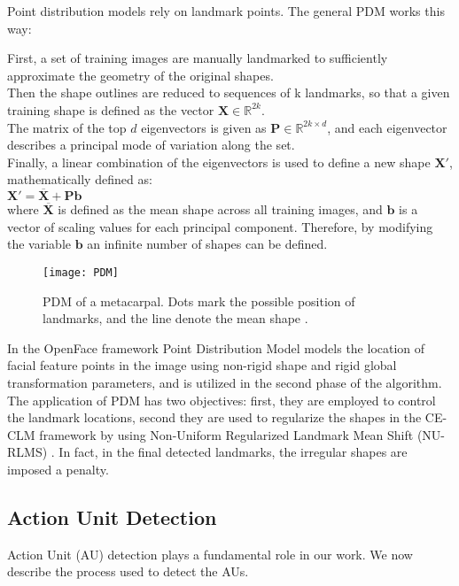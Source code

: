 Point distribution models rely on landmark points. The general PDM works this way:

First, a set of training images are manually landmarked to sufficiently approximate the geometry of the original shapes.\\
Then the shape outlines are reduced to sequences of k landmarks, so that a given training shape is defined as the vector $\mathbf{X} \in {\mathbb{R} ^{2k}}$.\\
The matrix of the top $d$ eigenvectors is given as $\mathbf{P} \in \mathbb{R}^{2k \times d}$, and each eigenvector describes a principal mode of variation along the set.\\
Finally, a linear combination of the eigenvectors is used to define a new shape $ \mathbf{X} '$, mathematically defined as: \\ 
$\mathbf {X}' = {\overline {\mathbf {X}} + \mathbf{P} \mathbf{b}}$ \\
where $ {\overline {\mathbf {X}}}$ is defined as the mean shape across all training images, and $\mathbf {b}$ is a vector of scaling values for each principal component. Therefore, by modifying the variable $\mathbf {b}$  an infinite number of shapes can be defined.

\begin{figure}[H]
	\centering
	\texttt{[image: PDM]}
	\caption{PDM of a metacarpal. Dots mark the possible position of landmarks, and the line denote the mean shape \cite{PDM}.}
	\label{fig:PDM}
\end{figure}

In the OpenFace framework Point Distribution Model \cite{PDM_RLMS} models the location of facial feature points in the image using non-rigid shape and rigid global transformation parameters, and is utilized in the second phase of the algorithm.\\
The application of PDM has two objectives: first, they are employed to control the landmark locations, second they are used to regularize the shapes in the CE-CLM framework by using	Non-Uniform Regularized Landmark Mean Shift (NU-RLMS) \cite{Baltru2013}. In fact, in the final detected landmarks, the irregular shapes are imposed a penalty.

\subsection{Action Unit Detection}
Action Unit (AU) detection plays a fundamental role in our work. We now describe the process used to detect the AUs.

